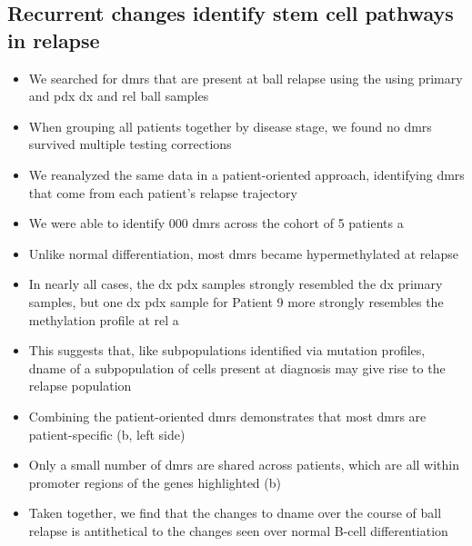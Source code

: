 
\subsection{Recurrent  changes identify stem cell pathways in relapse}

\begin{itemize}
  \item We searched for \glspl{dmr} that are present at \gls{ball} relapse using the using primary and \gls{pdx} \gls{dx} and \gls{rel} \gls{ball} samples
  \item When grouping all patients together by disease stage, we found no \glspl{dmr} survived multiple testing corrections
  \item We reanalyzed the same data in a patient-oriented approach, identifying \glspl{dmr} that come from each patient's relapse trajectory
  \item We were able to identify  000 \glspl{dmr} across the cohort of 5 patients a
  \item Unlike normal differentiation, most \glspl{dmr} became hypermethylated at relapse
  \item In nearly all cases, the \gls{dx} \gls{pdx} samples strongly resembled the \gls{dx} primary samples, but one \gls{dx} \gls{pdx} sample for Patient 9 more strongly resembles the methylation profile at \gls{rel} a
  \item This suggests that, like subpopulations identified via mutation profiles, \gls{dname} of a subpopulation of cells present at diagnosis may give rise to the relapse population
  \item Combining the patient-oriented \glspl{dmr} demonstrates that most \glspl{dmr} are patient-specific (b, left side)
  \item Only a small number of \glspl{dmr} are shared across patients, which are all within promoter regions of the genes highlighted (b)
  \item Taken together, we find that the changes to \gls{dname} over the course of \gls{ball} relapse is antithetical to the changes seen over normal B-cell differentiation
\end{itemize}

